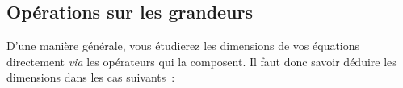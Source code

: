\documentclass[../../main/main.tex]{subfiles}
\begin{document}
\vspace{-10pt}
\subsection{Opérations sur les grandeurs}
D'une manière générale, vous étudierez les dimensions de vos équations
directement \textit{via} les opérateurs qui la composent. Il faut donc savoir
déduire les dimensions dans les cas suivants~:
\end{document}
